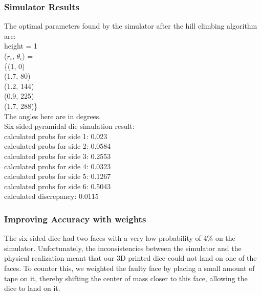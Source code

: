 \subsubsection{Simulator Results}
The optimal parameters found by the simulator after the hill climbing algorithm are:\\
height = 1\\
($r_i$, $\theta_i$) = \\
\{(1, 0)\\
(1.7, 80)\\
(1.2, 144)\\
(0.9, 225)\\
(1.7, 288)\}\\
The angles here are in degrees.\\
Six sided pyramidal die simulation result:\\
calculated probs for side 1: 0.023 \\
calculated probs for side 2: 0.0584 \\
calculated probs for side 3: 0.2553 \\
calculated probs for side 4: 0.0323 \\
calculated probs for side 5: 0.1267 \\
calculated probs for side 6: 0.5043  \\
calculated discrepancy: 0.0115\\

\subsubsection{Improving Accuracy with weights}
The six sided dice had two faces with a very low probability of 4\% on the simulator. Unfortunately, the inconsistencies between the simulator and the physical realization meant that our 3D printed dice could not land on one of the faces. To counter this, we weighted the faulty face by placing a small amount of tape on it, thereby shifting the center of mass closer to this face, allowing the dice to land on it.\\

